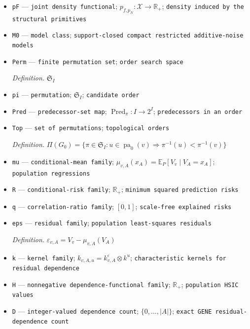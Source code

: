 \documentclass{article}
\begin{document}
\begin{itemize}
  \par\smallskip\noindent\emph{Definition.} \(P=\mathcal L(V)\)
  \item \texttt{pF} --- \texttt{joint density functional}; \(p_{f,p_N}:\mathcal X\to\mathbb R_+\); \texttt{density induced by the structural primitives}
  \item \texttt{M0} --- \texttt{model class}; \texttt{support-\allowbreak{}closed compact restricted additive-\allowbreak{}noise models}
  \item \texttt{Perm} --- \texttt{finite permutation set}; \texttt{order search space}
  \par\smallskip\noindent\emph{Definition.} \(\mathfrak S_I\)
  \item \texttt{pi} --- \texttt{permutation}; \(\mathfrak S_I\); \texttt{candidate order}
  \item \texttt{Pred} --- \texttt{predecessor-\allowbreak{}set map}; \(\operatorname{Pred}_{\pi}:I\to2^I\); \texttt{predecessors in an order}
  \item \texttt{Top} --- \texttt{set of permutations}; \texttt{topological orders}
  \par\smallskip\noindent\emph{Definition.} \(\Pi(G_0)=\{\pi\in\mathfrak S_I:u\in\operatorname{pa}_0(v)\Rightarrow\pi^{-1}(u)<\pi^{-1}(v)\}\)
  \item \texttt{mu} --- \texttt{conditional-\allowbreak{}mean family}; \(\mu_{v,A}(x_A)=\mathbb E_P[V_v\mid V_A=x_A]\); \texttt{population regressions}
  \item \texttt{R} --- \texttt{conditional-\allowbreak{}risk family}; \(\mathbb R_+\); \texttt{minimum squared prediction risks}
  \item \texttt{q} --- \texttt{correlation-\allowbreak{}ratio family}; \([0,1]\); \texttt{scale-\allowbreak{}free explained risks}
  \item \texttt{eps} --- \texttt{residual family}; \texttt{population least-\allowbreak{}squares residuals}
  \par\smallskip\noindent\emph{Definition.} \(\varepsilon_{v,A}=V_v-\mu_{v,A}(V_A)\)
  \item \texttt{k} --- \texttt{kernel family}; \(k_{v,A,u}=k^{\varepsilon}_{v,A}\otimes k^u\); \texttt{characteristic kernels for residual dependence}
  \item \texttt{H} --- \texttt{nonnegative dependence-\allowbreak{}functional family}; \(\mathbb R_+\); \texttt{population HSIC values}
  \item \texttt{D} --- \texttt{integer-\allowbreak{}valued dependence count}; \(\{0,\ldots,|A|\}\); \texttt{exact GENE residual-\allowbreak{}dependence count}

\end{itemize}
\end{document}
